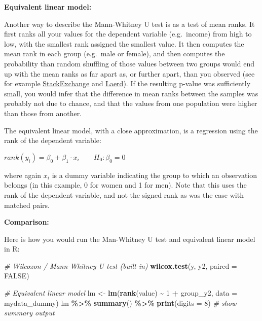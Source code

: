 \documentclass[
  12pt,
]{krantz}
\newenvironment{Shaded}{\begin{snugshade}}{\end{snugshade}}
\newcommand{\CommentTok}[1]{\textcolor[rgb]{0.56,0.35,0.01}{\textit{#1}}}
\newcommand{\DataTypeTok}[1]{\textcolor[rgb]{0.13,0.29,0.53}{#1}}
\newcommand{\DecValTok}[1]{\textcolor[rgb]{0.00,0.00,0.81}{#1}}
\newcommand{\KeywordTok}[1]{\textcolor[rgb]{0.13,0.29,0.53}{\textbf{#1}}}
\newcommand{\NormalTok}[1]{#1}
\newcommand{\OperatorTok}[1]{\textcolor[rgb]{0.81,0.36,0.00}{\textbf{#1}}}
\newcommand{\OtherTok}[1]{\textcolor[rgb]{0.56,0.35,0.01}{#1}}
\newcommand{\StringTok}[1]{\textcolor[rgb]{0.31,0.60,0.02}{#1}}
\begin{document}
\textbf{Equivalent linear model:}

Another way to describe the Mann-Whitney U test is as a test of mean ranks. It first ranks all your values for the dependent variable (e.g.~income) from high to low, with the smallest rank assigned the smallest value. It then computes the mean rank in each group (e.g.~male or female), and then computes the probability than random shuffling of those values between two groups would end up with the mean ranks as far apart as, or further apart, than you observed (see for example \href{https://stats.stackexchange.com/questions/113334/mann-whitney-test-with-unequal-variances}{StackExchange} and \href{https://statistics.laerd.com/premium-sample/mwut/mann-whitney-test-in-spss-2.php}{Laerd}). If the resulting p-value was sufficiently small, you would infer that the difference in mean ranks between the samples was probably not due to chance, and that the values from one population were higher than those from another.

The equivalent linear model, with a close approximation, is a regression using the rank of the dependent variable:

\begin{center}

\(rank(y_i) = \beta_0 + \beta_1 \cdot x_i \qquad H_0: \beta_0 = 0\)

\end{center}

where again \(x_i\) is a dummy variable indicating the group to which an observation belongs (in this example, 0 for women and 1 for men). Note that this uses the rank of the dependent variable, and not the signed rank as was the case with matched pairs.

\textbf{Comparison:}

Here is how you would run the Man-Whitney U test and equivalent linear model in R:

\begin{Shaded}
\begin{Highlighting}[]
\CommentTok{\# Wilcoxon / Mann{-}Whitney U test (built{-}in)}
\KeywordTok{wilcox.test}\NormalTok{(y, y2, }\DataTypeTok{paired =} \OtherTok{FALSE}\NormalTok{)}

\CommentTok{\# Equivalent linear model}
\NormalTok{lm \textless{}{-}}\StringTok{ }\KeywordTok{lm}\NormalTok{(}\KeywordTok{rank}\NormalTok{(value) }\OperatorTok{\textasciitilde{}}\StringTok{ }\DecValTok{1} \OperatorTok{+}\StringTok{ }\NormalTok{group\_y2, }\DataTypeTok{data =}\NormalTok{ mydata\_dummy)}
\NormalTok{  lm }\OperatorTok{\%\textgreater{}\%}\StringTok{ }\KeywordTok{summary}\NormalTok{() }\OperatorTok{\%\textgreater{}\%}\StringTok{ }\KeywordTok{print}\NormalTok{(}\DataTypeTok{digits =} \DecValTok{8}\NormalTok{) }\CommentTok{\# show summary output}
\end{Highlighting}
\end{Shaded}
\end{document}

